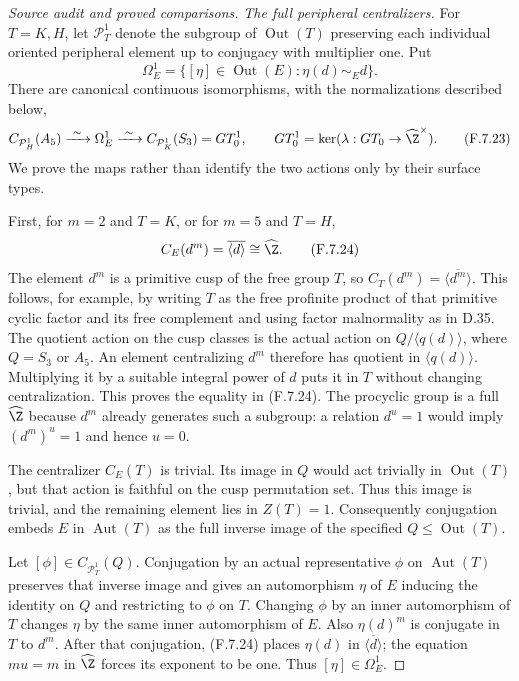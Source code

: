 \begin{proof}[Source audit and proved comparisons]
\emph{The full peripheral centralizers.}
For $T=K,H$, let $\mathcal P_T^1$ denote the subgroup
of $\operatorname{Out}(T)$ preserving each individual
oriented peripheral element up to conjugacy with
multiplier one.  Put
\[
 \Omega_E^1=\{[\eta]\in\operatorname{Out}(E):
                         \eta(d)\sim_E d\}.
\]
There are canonical continuous isomorphisms, with
the normalizations described below,
\[
 C_{\mathcal P_H^1}(A_5)
       \xrightarrow{\ \sim\ }\Omega_E^1
       \xrightarrow{\ \sim\ }
 C_{\mathcal P_K^1}(S_3)=GT_0^1,
 \qquad GT_0^1=\ker(\lambda:GT_0\to\widehat\Z^\times).
                                                               \tag{F.7.23}
\]
We prove the maps rather than identify the two actions
only by their surface types.

First, for $m=2$ and $T=K$, or for $m=5$ and $T=H$,
\[
                         C_E(d^m)=\overline{\langle d\rangle}
                                      \cong\widehat\Z . 
                                                               \tag{F.7.24}
\]
The element $d^m$ is a primitive cusp of the free group
$T$, so $C_T(d^m)=\overline{\langle d^m\rangle}$.
This follows, for example, by writing $T$ as the
free profinite product of that primitive cyclic factor
and its free complement and using factor malnormality
as in D.35.  The quotient action on the cusp classes
is the actual action on
$Q/\langle q(d)\rangle$, where $Q=S_3$ or $A_5$.
An element centralizing $d^m$ therefore has quotient
in $\langle q(d)\rangle$.  Multiplying it by a suitable
integral power of $d$ puts it in $T$ without changing
centralization.  This proves the equality in (F.7.24).
The procyclic group is a full $\widehat\Z$ because
$d^m$ already generates such a subgroup: a relation
$d^u=1$ would imply $(d^m)^u=1$ and hence $u=0$.

The centralizer $C_E(T)$ is trivial.  Its image in
$Q$ would act trivially in $\operatorname{Out}(T)$,
but that action is faithful on the cusp permutation
set.  Thus this image is trivial, and the remaining
element lies in $Z(T)=1$.
Consequently conjugation embeds $E$ in
$\operatorname{Aut}(T)$ as the full inverse image
of the specified $Q\leq\operatorname{Out}(T)$.

Let $[\phi]\in C_{\mathcal P_T^1}(Q)$.
Conjugation by an actual representative $\phi$ on
$\operatorname{Aut}(T)$ preserves that inverse image
and gives an automorphism $\eta$ of $E$ inducing
the identity on $Q$ and restricting to $\phi$ on $T$.
Changing $\phi$ by an inner automorphism of $T$
changes $\eta$ by the same inner automorphism of $E$.
Also $\eta(d)^m$ is conjugate in $T$ to $d^m$.
After that conjugation, (F.7.24) places $\eta(d)$
in $\overline{\langle d\rangle}$; the equation
$m u=m$ in $\widehat\Z$ forces its exponent to be
one.  Thus $[\eta]\in\Omega_E^1$.


\end{proof}
